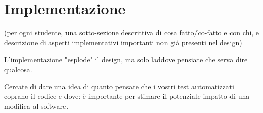 \section{Implementazione}
(per ogni studente, una sotto-sezione descrittiva di cosa fatto/co-fatto e con chi, e descrizione di aspetti implementativi importanti non già presenti nel design)


L'implementazione "esplode" il design, ma solo laddove pensiate che serva dire qualcosa.

Cercate di dare una idea di quanto pensate che i vostri test automatizzati coprano il codice e dove: è importante per stimare il potenziale impatto di una modifica al software.
